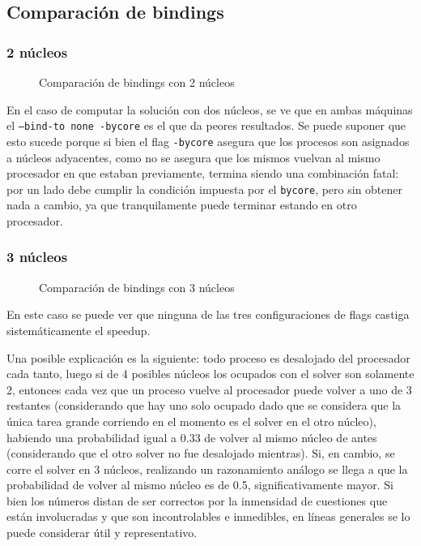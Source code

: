 \documentclass{article}
\begin{document}
\subsection{Comparación de bindings}
\subsubsection{2 núcleos}
\begin{figure}[H]
    
    \caption{Comparación de bindings con 2 núcleos}
\end{figure}
En el caso de computar la solución con dos núcleos, se ve que en ambas máquinas el \texttt{--bind-to none -bycore} es el que da peores resultados. Se puede suponer que esto sucede porque si bien el flag \texttt{-bycore} asegura que los procesos son asignados a núcleos adyacentes, como no se asegura que los mismos vuelvan al mismo procesador en que estaban previamente, termina siendo una combinación fatal: por un lado debe cumplir la condición impuesta por el \texttt{bycore}, pero sin obtener nada a cambio, ya que tranquilamente puede terminar estando en otro procesador.

\subsubsection{3 núcleos}
\begin{figure}[H]
    
    \caption{Comparación de bindings con 3 núcleos}
\end{figure}
En este caso se puede ver que ninguna de las tres configuraciones de flags castiga sistemáticamente el speedup. 

Una posible explicación es la siguiente: todo proceso es desalojado del procesador cada tanto, luego si de 4 posibles núcleos los ocupados con el solver son solamente 2, entonces cada vez que un proceso vuelve al procesador puede volver a uno de 3 restantes (considerando que hay uno solo ocupado dado que se considera que la única tarea grande corriendo en el momento es el solver en el otro núcleo), habiendo una probabilidad igual a 0.33 de volver al mismo núcleo de antes (considerando que el otro solver no fue desalojado mientras). Si, en cambio, se corre el solver en 3 núcleos, realizando un razonamiento análogo se llega a que la probabilidad de volver al mismo núcleo es de 0.5, significativamente mayor. Si bien los números distan de ser correctos por la inmensidad de cuestiones que están involucradas y que son incontrolables e inmedibles, en líneas generales se lo puede considerar útil y representativo.
\end{document}

